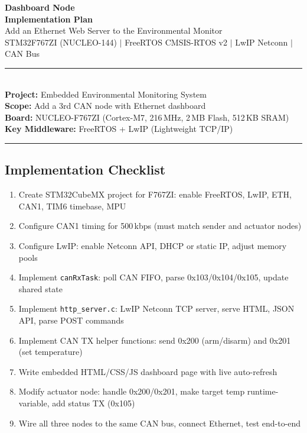 \documentclass[11pt,a4paper]{article}
\begin{document}
\begin{center}
  \vspace*{1.5cm}
  {\Huge\bfseries\color{accentblue} Dashboard Node\\[0.3em] Implementation Plan}\\[1.5em]
  {\Large Add an Ethernet Web Server to the Environmental Monitor}\\[1em]
  {\large STM32F767ZI (NUCLEO-144) $|$ FreeRTOS CMSIS-RTOS v2 $|$ LwIP Netconn $|$ CAN Bus}\\[2em]
  \rule{0.8\textwidth}{0.4pt}\\[1.5em]
  {\large\textbf{Project:} Embedded Environmental Monitoring System}\\[0.5em]
  {\large\textbf{Scope:} Add a 3rd CAN node with Ethernet dashboard}\\[0.5em]
  {\large\textbf{Board:} NUCLEO-F767ZI (Cortex-M7, 216\,MHz, 2\,MB Flash, 512\,KB SRAM)}\\[0.5em]
  {\large\textbf{Key Middleware:} FreeRTOS + LwIP (Lightweight TCP/IP)}\\[2em]
  \rule{0.8\textwidth}{0.4pt}
\end{center}

\vfill

\subsection*{Implementation Checklist}
\begin{enumerate}[leftmargin=2em]
  \item Create STM32CubeMX project for F767ZI: enable FreeRTOS, LwIP, ETH, CAN1, TIM6 timebase, MPU
  \item Configure CAN1 timing for 500\,kbps (must match sender and actuator nodes)
  \item Configure LwIP: enable Netconn API, DHCP or static IP, adjust memory pools
  \item Implement \texttt{canRxTask}: poll CAN FIFO, parse 0x103/0x104/0x105, update shared state
  \item Implement \texttt{http\_server.c}: LwIP Netconn TCP server, serve HTML, JSON API, parse POST commands
  \item Implement CAN TX helper functions: send 0x200 (arm/disarm) and 0x201 (set temperature)
  \item Write embedded HTML/CSS/JS dashboard page with live auto-refresh
  \item Modify actuator node: handle 0x200/0x201, make target temp runtime-variable, add status TX (0x105)
  \item Wire all three nodes to the same CAN bus, connect Ethernet, test end-to-end
\end{enumerate}
\end{document}
